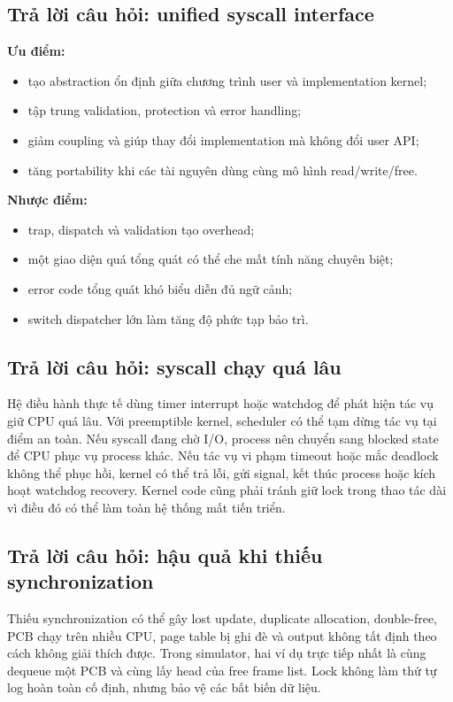 \documentclass[12pt,a4paper]{article}
\begin{document}
\subsection{Trả lời câu hỏi: unified syscall interface}
\textbf{Ưu điểm:}
\begin{itemize}
  \item tạo abstraction ổn định giữa chương trình user và implementation kernel;
  \item tập trung validation, protection và error handling;
  \item giảm coupling và giúp thay đổi implementation mà không đổi user API;
  \item tăng portability khi các tài nguyên dùng cùng mô hình read/write/free.
\end{itemize}
\textbf{Nhược điểm:}
\begin{itemize}
  \item trap, dispatch và validation tạo overhead;
  \item một giao diện quá tổng quát có thể che mất tính năng chuyên biệt;
  \item error code tổng quát khó biểu diễn đủ ngữ cảnh;
  \item switch dispatcher lớn làm tăng độ phức tạp bảo trì.
\end{itemize}

\subsection{Trả lời câu hỏi: syscall chạy quá lâu}
Hệ điều hành thực tế dùng timer interrupt hoặc watchdog để phát hiện tác vụ giữ CPU quá
lâu. Với preemptible kernel, scheduler có thể tạm dừng tác vụ tại điểm an toàn. Nếu syscall
đang chờ I/O, process nên chuyển sang blocked state để CPU phục vụ process khác. Nếu
tác vụ vi phạm timeout hoặc mắc deadlock không thể phục hồi, kernel có thể trả lỗi, gửi
signal, kết thúc process hoặc kích hoạt watchdog recovery. Kernel code cũng phải tránh
giữ lock trong thao tác dài vì điều đó có thể làm toàn hệ thống mất tiến triển.

\subsection{Trả lời câu hỏi: hậu quả khi thiếu synchronization}
Thiếu synchronization có thể gây lost update, duplicate allocation, double-free, PCB chạy
trên nhiều CPU, page table bị ghi đè và output không tất định theo cách không giải thích
được. Trong simulator, hai ví dụ trực tiếp nhất là cùng dequeue một PCB và cùng lấy head
của free frame list. Lock không làm thứ tự log hoàn toàn cố định, nhưng bảo vệ các bất
biến dữ liệu.
\end{document}
